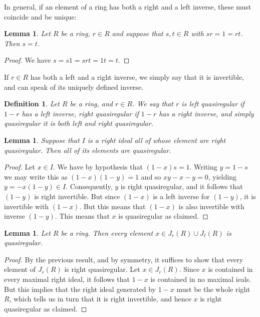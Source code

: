 \documentclass[12pt]{report}
\theoremstyle{plain}
\newtheorem{defn}[thm]{Definition}
\newtheorem{lem}[thm]{Lemma}
\newcommand{\X}[1]{#1\index{#1}}
\begin{document}
In general, if an element of a ring has both a right and a left inverse,
these must coincide and be unique:
\begin{lem}
Let $R$ be a ring, $r \in R$ and suppose that $s, t \in R$ with $sr = 1 =
rt$. Then $s = t$.
\end{lem}
\begin{proof}
We have $s = s1 = srt = 1t = t$.
\end{proof}
If $r \in R$ has both a left and a right inverse, we simply say that it is
invertible, and can speak of its uniquely defined inverse.

\begin{defn} 
Let $R$ be a ring, and $r \in R$. We say that $r$ is left \X{quasiregular}
if $1 - r$ has a left inverse, right quasiregular if $1 - r$ has a right
inverse, and simply quasiregular it is both left and right quasiregular. 
\end{defn}

\begin{lem}
Suppose that $I$ is a right ideal all of whose element are right
quasiregular. Then all of its elements are quasiregular.
\end{lem}
\begin{proof}
Let $x \in I$. We have by hypothesis that $(1 - x)s = 1$. Writing $y = 1 -
s$ we may write this as $(1 - x)(1 - y) = 1$ and so $xy - x - y = 0$,
yielding $y = -x(1 - y) \in I$. Consequently, $y$ is right quasiregular,
and it follows that $(1 - y)$ is right invertible. But since $(1 - x)$ is a
left inverse for $(1 - y)$, it is invertible with $(1 - x)$. But this means
that $(1 - x)$ is also invertible with inverse $(1 - y)$. This means that
$x$ is quasiregular as claimed.
\end{proof}

\begin{lem}
Let $R$ be a ring. Then every element $x \in J_r(R) \cup J_\ell(R)$ is
quasiregular.
\end{lem}
\begin{proof}
By the previous result, and by symmetry, it suffices to show that every
element of $J_r(R)$ is right quasiregular. Let $x \in J_r(R)$. Since $x$ is
contained in every maximal right ideal, it follows that $1 - x$ is
contained in no maximal ieals. But this implies that the right ideal
generated by $1 - x$ must be the whole right $R$, which tells us in turn
that it is right invertible, and hence $x$ is right quasiregular as
claimed.
\end{proof}
\end{document}
